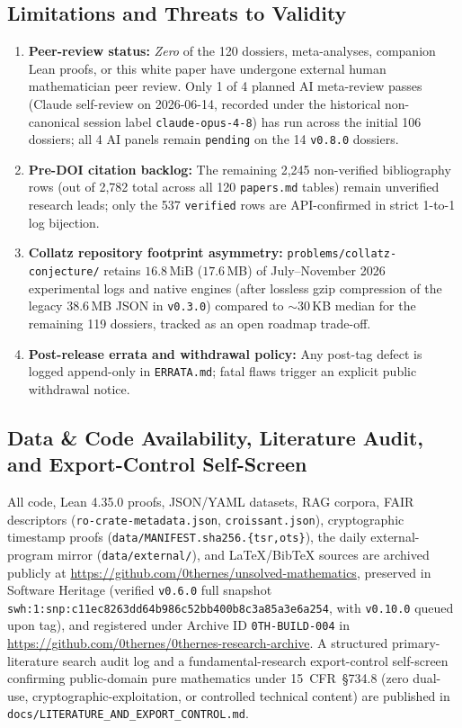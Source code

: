 \documentclass[11pt,reqno]{amsart}
\def\UrlBreaks{\do\.\do\/\do\-\do\_\do\:\do\=\do\,\do\{\do\}}
\theoremstyle{plain}
\theoremstyle{definition}
\newcommand{\code}[1]{{\upshape\nolinkurl{#1}}}
\newcommand{\hashcode}[1]{{\upshape\def\UrlBreaks{\do\:\do 0\do 1\do 2\do 3\do 4\do 5\do 6\do 7\do 8\do 9\do a\do b\do c\do d\do e\do f\do h\do n\do p\do s\do w}\nolinkurl{#1}}}
\begin{document}
\subsection{Limitations and Threats to Validity}
\begin{enumerate}
  \item \textbf{Peer-review status:} \emph{Zero} of the 120 dossiers, meta-analyses, companion
    Lean proofs, or this white paper have undergone external human mathematician peer review.
    Only 1 of 4 planned AI meta-review passes (Claude self-review on 2026-06-14, recorded under
    the historical non-canonical session label \code{claude-opus-4-8}) has run across the initial
    106 dossiers; all 4 AI panels remain \code{pending} on the 14 \texttt{v0.8.0} dossiers.
  \item \textbf{Pre-DOI citation backlog:} The remaining 2,245 non-verified bibliography rows
    (out of 2,782 total across all 120 \code{papers.md} tables) remain unverified research leads;
    only the 537 \code{verified} rows are API-confirmed in strict 1-to-1 log bijection.
  \item \textbf{Collatz repository footprint asymmetry:} \code{problems/collatz-conjecture/}
    retains $16.8$\,MiB ($17.6$\,MB) of July--November 2026 experimental logs and native engines
    (after lossless gzip compression of the legacy 38.6\,MB JSON in \texttt{v0.3.0}) compared to
    $\sim 30$\,KB median for the remaining 119 dossiers, tracked as an open roadmap trade-off.
  \item \textbf{Post-release errata and withdrawal policy:} Any post-tag defect is logged
    append-only in \code{ERRATA.md}; fatal flaws trigger an explicit public withdrawal notice.
\end{enumerate}

\subsection{Data \& Code Availability, Literature Audit, and Export-Control Self-Screen}
All code, Lean 4.35.0 proofs, JSON/YAML datasets, RAG corpora, FAIR descriptors
(\code{ro-crate-metadata.json}, \code{croissant.json}), cryptographic timestamp proofs
(\code{data/MANIFEST.sha256.{tsr,ots}}), the daily external-program mirror
(\code{data/external/}), and LaTeX/BibTeX sources are archived publicly at
\url{https://github.com/0thernes/unsolved-mathematics}, preserved in Software Heritage
(verified \texttt{v0.6.0} full snapshot
\hashcode{swh:1:snp:c11ec8263dd64b986c52bb400b8c3a85a3e6a254}, with \texttt{v0.10.0} queued upon tag),
and registered under Archive ID \code{0TH-BUILD-004} in
\url{https://github.com/0thernes/0thernes-research-archive}.
A structured primary-literature search audit log and a fundamental-research export-control
self-screen confirming public-domain pure mathematics under 15~CFR~\S734.8 (zero dual-use,
cryptographic-exploitation, or controlled technical content) are published in
\code{docs/LITERATURE_AND_EXPORT_CONTROL.md}.
\end{document}
